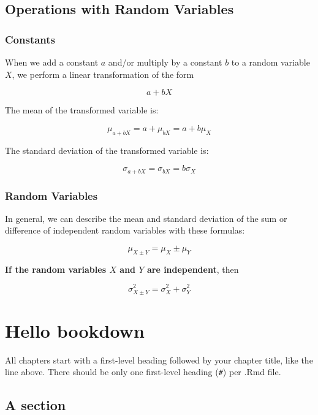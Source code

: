 \documentclass[
]{book}
\theoremstyle{definition}
\theoremstyle{definition}
\theoremstyle{definition}
\theoremstyle{definition}
\theoremstyle{remark}
\begin{document}
\hypertarget{operations-with-random-variables}{%
\section{Operations with Random Variables}\label{operations-with-random-variables}}

\hypertarget{constants}{%
\subsection{Constants}\label{constants}}

When we add a constant \(a\) and/or multiply by a constant \(b\) to a random
variable \(X\), we perform a linear transformation of the form

\[
a + bX
\]

The mean of the transformed variable is:

\[
\mu_{a+bX}=a+\mu_{bX}=a+b\mu_X
\]

The standard deviation of the transformed variable is:

\[
\sigma_{a+bX}=\sigma_{bX}=b\sigma_X
\]

\hypertarget{random-variables-1}{%
\subsection{Random Variables}\label{random-variables-1}}

In general, we can describe the mean and standard deviation of the sum
or difference of independent random variables with these formulas:

\[\mu_{X \pm Y} = \mu_X \pm \mu_Y\]

\textbf{If the random variables \(X\) and \(Y\) are independent}, then

\[ \sigma_{X \pm Y}^2 = \sigma_X^2 + \sigma_Y^2 \]

\hypertarget{hello-bookdown}{%
\chapter{Hello bookdown}\label{hello-bookdown}}

All chapters start with a first-level heading followed by your chapter title, like the line above. There should be only one first-level heading (\texttt{\#}) per .Rmd file.

\hypertarget{a-section}{%
\section{A section}\label{a-section}}
\end{document}
